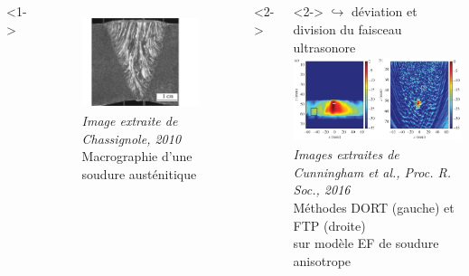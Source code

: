 \subsection*{}
\begin{frame}{\insertsectionhead}
\begin{small}
\vspace{-0.5cm}
\hspace{1cm}
	\begin{columns}[c]
			<1->
			\centering
			\begin{figure}
				\includegraphics[height=2.7cm]{./img/soudure1.png}\\
				{\tiny{ \itshape Image extraite de Chassignole, 2010} \\ \centering \scriptsize Macrographie d'une soudure austénitique  }
			\end{figure}
			<2->
			\hspace{-2.8cm}
			\vspace{2.5cm}
			<2->
			\hspace{-1cm}
			$\hookrightarrow$ déviation et division du faisceau ultrasonore\\[0.2cm]
			\hspace{-0.5cm}
			\hspace{1cm}\includegraphics[height=2.5cm]{img/tfm_dort.png}\\
			{\tiny{ \itshape Images extraites de Cunningham et al., Proc. R. Soc., 2016} \\[0.2cm] \hspace{1cm} \scriptsize Méthodes DORT (gauche) et FTP (droite)\\[-0.1cm] \hspace{1.5cm}sur modèle EF de soudure anisotrope }
				

\end{columns}
\end{small}
\end{frame}
